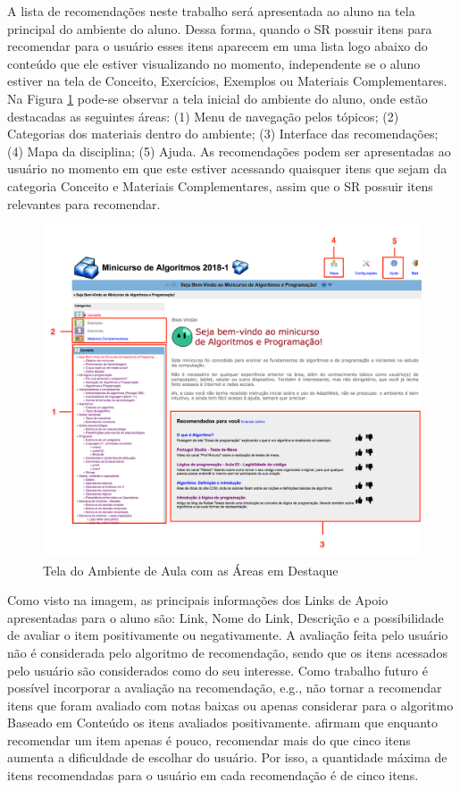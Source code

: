 A lista de recomendações neste trabalho será apresentada ao aluno na tela principal do ambiente do aluno. Dessa forma,
quando o SR possuir itens para recomendar para o usuário esses itens aparecem em uma lista logo abaixo do conteúdo que
ele estiver visualizando no momento, independente se o aluno estiver na tela de Conceito, Exercícios, Exemplos ou
Materiais Complementares. Na Figura \ref{fig:adaptweb-proposta-recomendacao} pode-se observar a tela inicial do ambiente do
aluno, onde estão destacadas as seguintes áreas: (1) Menu de navegação pelos tópicos; (2) Categorias dos materiais dentro
do ambiente; (3) Interface das recomendações; (4) Mapa da disciplina; (5) Ajuda. As recomendações podem ser apresentadas ao usuário no momento em que este estiver acessando
quaisquer itens que sejam da categoria Conceito e Materiais Complementares, assim que o SR possuir itens relevantes para recomendar.

\begin{figure}[htb]
  \caption{\label{fig:adaptweb-proposta-recomendacao}Tela do Ambiente de Aula com as Áreas em Destaque}
  \begin{center}
      \includegraphics[scale=0.4]{./Figuras/interface-recomendacao.png}
  \end{center}
\end{figure}

Como visto na imagem, as principais informações dos Links de Apoio apresentadas para o aluno são: Link, Nome do Link,
Descrição e a possibilidade de avaliar o item positivamente ou negativamente. A avaliação feita pelo usuário não é
considerada pelo algoritmo de recomendação, sendo que os itens acessados pelo
usuário são considerados como do seu interesse. Como trabalho futuro é possível incorporar a avaliação na recomendação, e.g.,
não tornar a recomendar itens que foram avaliado com notas baixas ou apenas considerar para o algoritmo Baseado em Conteúdo
os itens avaliados positivamente.  afirmam que enquanto recomendar um item apenas é pouco, recomendar mais do que cinco itens
aumenta a dificuldade de escolhar do usuário. Por isso, a quantidade máxima de itens recomendadas para o usuário em cada
recomendação é de cinco itens.

